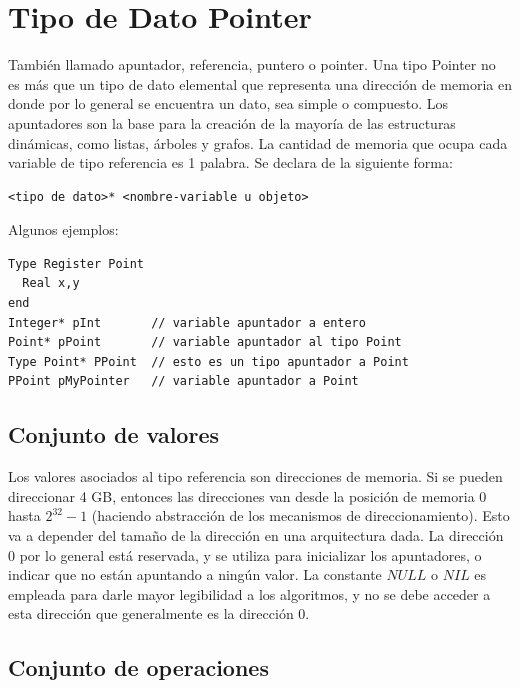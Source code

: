 \section{Tipo de Dato Pointer} \label{lb:pointer}

También llamado apuntador, referencia, puntero o pointer. Una tipo Pointer no es más que un tipo de dato elemental que representa una dirección de memoria en donde por lo general se encuentra un dato, sea simple o compuesto. Los apuntadores son la base para la creación de la mayoría de las estructuras dinámicas, como listas, árboles y grafos. La cantidad de memoria que ocupa cada variable de tipo referencia es 1 palabra. Se declara de la siguiente forma:

\begin{lstlisting}[upquote=true, language=pseudo]
<tipo de dato>* <nombre-variable u objeto>
\end{lstlisting}

Algunos ejemplos:

\begin{lstlisting}[upquote=true, language=pseudo]
Type Register Point
  Real x,y
end
Integer* pInt		// variable apuntador a entero
Point* pPoint		// variable apuntador al tipo Point
Type Point* PPoint	// esto es un tipo apuntador a Point
PPoint pMyPointer	// variable apuntador a Point
\end{lstlisting}

\subsection{Conjunto de valores}

Los valores asociados al tipo referencia son direcciones de memoria. Si se pueden direccionar 4 GB, entonces las direcciones van desde la posición de memoria $0$ hasta $2^{32}-1$ (haciendo abstracción de los mecanismos de direccionamiento). Esto va a depender del tamaño de la dirección en una arquitectura dada. La dirección 0 por lo general está reservada, y se utiliza para inicializar los apuntadores, o indicar que no están apuntando a ningún valor. La constante $NULL$ o $NIL$ es empleada para darle mayor legibilidad a los algoritmos, y no se debe acceder a esta dirección que generalmente es la dirección $0$.

\subsection{Conjunto de operaciones}

